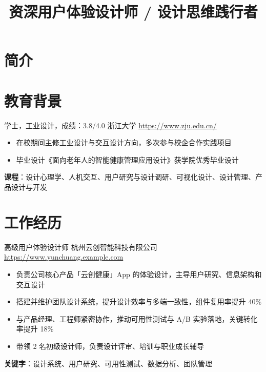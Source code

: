 \documentclass[a4paper, serif, 10pt]{moderncv}
\title{资深用户体验设计师 / 设计思维践行者}
\begin{document}
\maketitle

\section{简介}

\section{教育背景}

        {学士，工业设计，成绩：3.8/4.0}
        {浙江大学}
        {\url{https://www.zju.edu.cn/}}
        {}
        {\begin{itemize}
\item 在校期间主修工业设计与交互设计方向，多次参与校企合作实践项目
\item 毕业设计《面向老年人的智能健康管理应用设计》获学院优秀毕业设计
\end{itemize}
\textbf{课程}：设计心理学、人机交互、用户研究与设计调研、可视化设计、设计管理、产品设计与开发}
\section{工作经历}

        {高级用户体验设计师}
        {杭州云创智能科技有限公司}
        {\url{https://www.yunchuang.example.com}}
        {}
        {\begin{itemize}
\item 负责公司核心产品「云创健康」App 的体验设计，主导用户研究、信息架构和交互设计
\item 搭建并维护团队设计系统，提升设计效率与多端一致性，组件复用率提升 40\%
\item 与产品经理、工程师紧密协作，推动可用性测试与 A/B 实验落地，关键转化率提升 18\%
\item 带领 2 名初级设计师，负责设计评审、培训与职业成长辅导
\end{itemize}
\textbf{关键字}：设计系统、用户研究、可用性测试、数据分析、团队管理}
\end{document}
